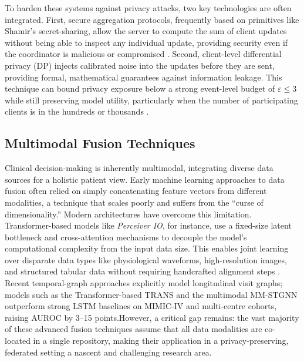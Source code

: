 \documentclass[12pt]{report}
\begin{document}
To harden these systems against privacy attacks, two key technologies are often integrated. First, secure aggregation protocols, frequently based on primitives like Shamir's secret-sharing, allow the server to compute the sum of client updates without being able to inspect any individual update, providing security even if the coordinator is malicious or compromised \cite{Bonawitz2017SecureAgg}. Second, client-level differential privacy (DP) injects calibrated noise into the updates before they are sent, providing formal, mathematical guarantees against information leakage. This technique can bound privacy exposure below a strong event-level budget of $\varepsilon \le 3$ while still preserving model utility, particularly when the number of participating clients is in the hundreds or thousands \cite{Geyer2018DPFL}.

\subsection{Multimodal Fusion Techniques}
Clinical decision-making is inherently multimodal, integrating diverse data sources for a holistic patient view. Early machine learning approaches to data fusion often relied on simply concatenating feature vectors from different modalities, a technique that scales poorly and suffers from the “curse of dimensionality.” Modern architectures have overcome this limitation. Transformer-based models like \emph{Perceiver IO}, for instance, use a fixed-size latent bottleneck and cross-attention mechanisms to decouple the model's computational complexity from the input data size. This enables joint learning over disparate data types like physiological waveforms, high-resolution images, and structured tabular data without requiring handcrafted alignment steps \cite{Jaegle2021PerceiverIO}. Recent temporal-graph approaches explicitly model longitudinal visit graphs; models such as the Transformer-based TRANS\cite{Chen2024TRANS} and the multimodal MM-STGNN\cite{Tang2023MMSTGNN,Tang2023JBHI} outperform strong LSTM baselines on MIMIC-IV and multi-centre cohorts, raising AUROC by 3–15 points.However, a critical gap remains: the vast majority of these advanced fusion techniques assume that all data modalities are co-located in a single repository, making their application in a privacy-preserving, federated setting a nascent and challenging research area.
\end{document}
